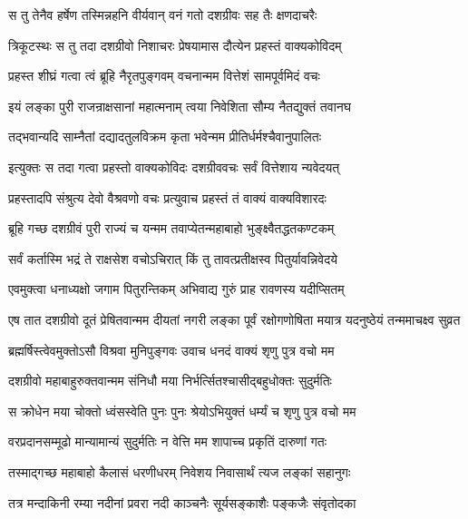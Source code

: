 \twolineshloka
{स तु तेनैव हर्षेण तस्मिन्नहनि वीर्यवान्}
{वनं गतो दशग्रीवः सह तैः क्षणदाचरैः} %

\twolineshloka
{त्रिकूटस्थः स तु तदा दशग्रीवो निशाचरः}
{प्रेषयामास दौत्येन प्रहस्तं वाक्यकोविदम्} %

\twolineshloka
{प्रहस्त शीघ्रं गत्वा त्वं ब्रूहि नैरृतपुङ्गवम्}
{वचनान्मम वित्तेशं सामपूर्वमिदं वचः} %

\twolineshloka
{इयं लङ्का पुरी राजन्राक्षसानां महात्मनाम्}
{त्वया निवेशिता सौम्य नैतद्युक्तं तवानघ} %

\twolineshloka
{तद्भवान्यदि साम्नैतां दद्यादतुलविक्रम}
{कृता भवेन्मम प्रीतिर्धर्मश्चैवानुपालितः} %

\twolineshloka
{इत्युक्तः स तदा गत्वा प्रहस्तो वाक्यकोविदः}
{दशग्रीववचः सर्वं वित्तेशाय न्यवेदयत्} %

\twolineshloka
{प्रहस्तादपि संश्रुत्य देवो वैश्रवणो वचः}
{प्रत्युवाच प्रहस्तं तं वाक्यं वाक्यविशारदः} %

\twolineshloka
{ब्रूहि गच्छ दशग्रीवं पुरी राज्यं च यन्मम}
{तवाप्येतन्महाबाहो भुङ्क्ष्वैतद्धतकण्टकम्} %

\twolineshloka
{सर्वं कर्तास्मि भद्रं ते राक्षसेश वचोऽचिरात्}
{किं तु तावत्प्रतीक्षस्व पितुर्यावन्निवेदये} %

\twolineshloka
{एवमुक्त्वा धनाध्यक्षो जगाम पितुरन्तिकम्}
{अभिवाद्य गुरुं प्राह रावणस्य यदीप्सितम्} %

\threelineshloka
{एष तात दशग्रीवो दूतं प्रेषितवान्मम}
{दीयतां नगरी लङ्का पूर्वं रक्षोगणोषिता}
{मयात्र यदनुष्ठेयं तन्ममाचक्ष्व सुव्रत} %

\twolineshloka
{ब्रह्मर्षिस्त्वेवमुक्तोऽसौ विश्रवा मुनिपुङ्गवः}
{उवाच धनदं वाक्यं शृणु पुत्र वचो मम} %

\twolineshloka
{दशग्रीवो महाबाहुरुक्तवान्मम संनिधौ}
{मया निर्भर्त्सितश्चासीद्बहुधोक्तः सुदुर्मतिः} %

\twolineshloka
{स क्रोधेन मया चोक्तो ध्वंसस्वेति पुनः पुनः}
{श्रेयोऽभियुक्तं धर्म्यं च शृणु पुत्र वचो मम} %

\twolineshloka
{वरप्रदानसम्मूढो मान्यामान्यं सुदुर्मतिः}
{न वेत्ति मम शापाच्च प्रकृतिं दारुणां गतः} %

\twolineshloka
{तस्माद्गच्छ महाबाहो कैलासं धरणीधरम्}
{निवेशय निवासार्थं त्यज लङ्कां सहानुगः} %

\twolineshloka
{तत्र मन्दाकिनी रम्या नदीनां प्रवरा नदी}
{काञ्चनैः सूर्यसङ्काशैः पङ्कजैः संवृतोदका} %

